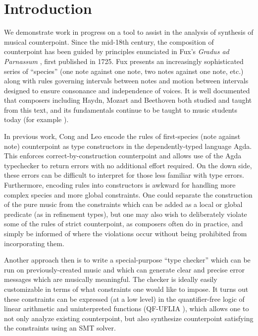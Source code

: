 \documentclass[sigplan,screen]{acmart}
\begin{document}
\section{Introduction}

We demonstrate work in progress on a tool to assist in the analysis of
synthesis of musical counterpoint. Since the mid-18th century, the
composition of counterpoint has been guided by principles enunciated
in Fux's \textit{Gradus ad Parnassum} \citep{Fux1965}, first published
in 1725. Fux presents an increasingly sophisticated series of
``species'' (one note against one note, two notes against one note,
etc.) along with rules governing intervals between notes and motion
between intervals designed to ensure consonance and independence of
voices. It is well documented \citep{Mann1987} that composers
including Haydn, Mozart and Beethoven both studied and taught from
this text, and its fundamentals continue to be taught to music students
today (for example \cite{Kennan1999, Aldwell2018}).

In previous work, Cong and Leo \citep{CongLeo2019} encode the rules of
first-species (note against note) counterpoint as type constructors in
the dependently-typed language Agda. This enforces
correct-by-construction counterpoint and allows use of the Agda
typechecker to return errors with no additional effort required. On
the down side, these errors can be difficult to interpret for those
less familiar with type errors. Furthermore, encoding rules into
constructors is awkward for handling more complex species and more
global constraints. One could separate the construction of the pure
music from the constraints which can be added as a local or global
predicate (as in refinement types), but one may also wish to
deliberately violate some of the rules of strict counterpoint, as
composers often do in practice, and simply be informed of where the
violations occur without being prohibited from incorporating them.

Another approach then is to write a special-purpose ``type checker''
which can be run on previously-created music and which can generate
clear and precise error messages which are musically meaningful. The
checker is ideally easily customizable in terms of what constraints
one would like to impose. It turns out these constraints can be
expressed (at a low level) in the quantifier-free logic of linear
arithmetic and uninterpreted functions (QF-UFLIA \cite{Barrett2010}),
which allows one to not only analyze existing counterpoint, but also
synthesize counterpoint satisfying the constraints using an SMT
solver.
\end{document}
